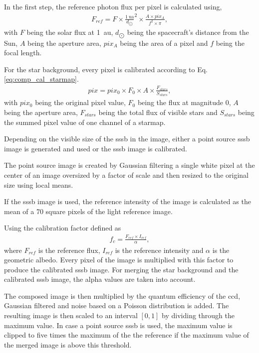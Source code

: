 In the first step, the reference photon flux per pixel is calculated using,
\begin{align}
        F_{ref} = F \times \frac{\SI{1}{\astronomicalunit}}{d_{\bigodot}}^2 \times \frac{A \times pix_A}{f^2 \times \pi}, \label{eq:comp_ref_flux}
\end{align}
with $F$ being the solar flux at \SI{1}{\astronomicalunit}, $d_{\bigodot}$ being the spacecraft's distance from the Sun, $A$ being the aperture area, $pix_A$ being the area of a pixel and $f$ being the focal length.

For the star background, every pixel is calibrated according to Eq. \ref{eq:comp_cal_starmap}.
\begin{align}
        pix = pix_0 \times F_0 \times A \times \frac{F_{stars}}{S_{stars}}, \label{eq:comp_cal_starmap}
\end{align}
with $pix_0$ being the original pixel value, $F_0$ being the flux at magnitude 0, $A$ being the aperture area, $F_{stars}$ being the total flux of visible stars and $S_{stars}$ being the summed pixel value of one channel of a starmap.

Depending on the visible size of the \gls{sssb} in the image, either a point source \gls{sssb} image is generated and used or the \gls{sssb} image is calibrated.

The point source image is created by Gaussian filtering a single white pixel at the center of an image oversized by a factor of scale and then resized to the original size using local means.

If the \gls{sssb} image is used, the reference intensity of the image is calculated as the mean of a \SI{70}{} square pixels of the light reference image.

Using the calibration factor defined as
\begin{align}
    f_c = \frac{F_{ref} \times I_{ref}}{\alpha}, \label{eq:comp_cal_fac}
\end{align}
where $F_{ref}$ is the reference flux, $I_{ref}$ is the reference intensity and $\alpha$ is the geometric albedo. Every pixel of the image is multiplied with this factor to produce the calibrated \gls{sssb} image. For merging the star background and the calibrated \gls{sssb} image, the alpha values are taken into account.

The composed image is then multiplied by the quantum efficiency of the \gls{ccd}, Gaussian filtered and noise based on a Poisson distribution is added. The resulting image is then scaled to an interval $[0,1]$ by dividing through the maximum value. In case a point source \gls{sssb} is used, the maximum value is clipped to five times the maximum of the the reference if the maximum value of the merged image is above this threshold.

